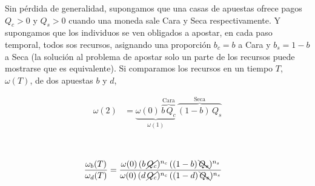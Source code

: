 \documentclass[a4paper,10pt]{article}
\newif\ifen
\newif\ifes
\newcommand{\en}[1]{\ifen#1 \fi}
\newcommand{\es}[1]{\ifes#1 \fi}
\begin{document}
\en{Since its origin, life has acquired an extraordinary complexity in terms of diversification, cooperation, specialization and coexistence.}%
\es{Desde su origen, la vida adquirió una extraordinaria complejidad en términos diversificación, cooperación, especialización y coexistencia.}%
%
\en{Why does that happen?}%
\es{¿Por qué ocurre eso?}%
%
Sin pérdida de generalidad, supongamos que una casas de apuestas ofrece pagos $Q_c > 0$ y $Q_s > 0$ cuando una moneda sale Cara y Seca respectivamente.
%
Y supongamos que los individuos se ven obligados a apostar, en cada paso temporal, todos sos recursos, asignando una proporción $b_c = b$ a Cara y $b_s = 1 - b$ a Seca (la solución al problema de apostar solo un parte de los recursos puede mostrarse que es equivalente).
%
Si comparamos los recursos en un tiempo $T$, $\omega(T)$, de dos apuestas $b$ y $d$,
%
\vspace{-0.4cm}
\begin{figure}[ht!]
 \centering
 \begin{subfigure}[b]{0.44\textwidth}
 \begin{equation*}
\begin{split}
\omega(2) & = \underbrace{\omega(0) \, \overbrace{b \,  Q_c}^{\text{Cara}}}_{\omega(1)} \, \overbrace{(1-b) \, Q_s}^{\text{Seca}}
\end{split}
\end{equation*}
 \end{subfigure}
 \
 \begin{subfigure}[b]{0.54\textwidth}
  \begin{equation*}
\begin{split}
& \frac{\omega_b(T)}{\omega_d(T)} = \frac{\omega(0) \,  (b \,  \cancel{Q_c})^{n_c}  \,  ((1-b) \, \bcancel{Q_s})^{n_s}}{\omega(0) \,   (d \,  \cancel{Q_c})^{n_c}  \,  ((1-d) \, \bcancel{Q_s})^{n_s}}
\end{split}
\end{equation*}
 \end{subfigure}
\end{figure}
\vspace{-0.1cm}
\end{document}
